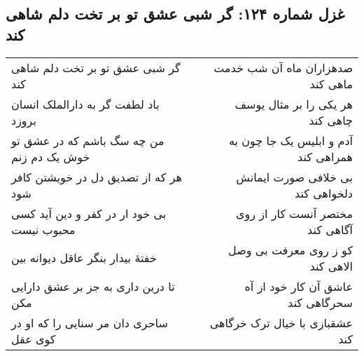 \begin{center}
\section*{غزل شماره ۱۲۴: گر شبی عشق تو بر تخت دلم شاهی کند}
\label{sec:124}
\begin{longtable}{l p{0.5cm} r}
گر شبی عشق تو بر تخت دلم شاهی کند
&&
صدهزاران ماه آن شب خدمت ماهی کند
\\
باد لطفت گر به دارالملک انسان بروزد
&&
هر یکی را بر مثال یوسف چاهی کند
\\
من چه سگ باشم که در عشق تو خوش یک دم زنم
&&
آدم و ابلیس یک جا چون به همراهی کند
\\
هر که از تصدیق دل در خویشتن کافر شود
&&
بی خلافی صورت ایمانش دلخواهی کند
\\
بی خود ار در کفر و دین آید کسی محبوب نیست
&&
مختصر آنست کار از روی آگاهی کند
\\
خفتهٔ بیدار بنگر عاقل دیوانه بین
&&
کو ز روی معرفت بی وصل الاهی کند
\\
تا درین داری به جز بر عشق دارایی مکن
&&
عاشق آن کار خود از آه سحرگاهی کند
\\
ساحری دان مر سنایی را که او در کوی عقل
&&
عشقبازی با خیال ترک خرگاهی کند
\\
\end{longtable}
\end{center}
